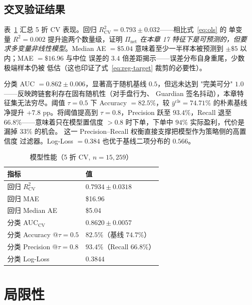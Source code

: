 \documentclass[sigconf,nonacm,10pt]{acmart}
\newcommand{\Pnet}{\Pi_{\text{net}}}
\begin{document}
\subsection{交叉验证结果}

表~\ref{tab:model} 汇总 5 折 CV 表现。回归
$R^2_{\text{CV}}=0.793\pm0.032$——相比式~\eqref{eq:ols} 的
单变量 $R^2=0.002$ 提升逾两个数量级，证明 \emph{$\Pnet$ 在本章
17 特征下是可预测的，但要求多变量非线性模型}。Median AE $=\$5.04$
意味着至少一半样本被预测到 $\pm\$5$ 以内；MAE $=\$16.96$ 与中位
误差的 $3.4$ 倍差距揭示——误差分布自身重尾，少数极端样本仍被
低估（这也印证了式~\eqref{eq:reg-target} 裁剪的必要性）。

分类 AUC $=0.862\pm0.006$，显著高于随机基线 $0.5$，但远未达到
"完美可分" $1.0$——反映跨链套利存在固有随机性（对手盘行为、
Guardian 签名抖动），本章特征集无法穷尽。阈值 $\tau=0.5$ 下
Accuracy $=82.5\%$，较 $\bar y^{\text{cls}}=74.71\%$ 的朴素基线
净提升 $+7.8$ pp。将阈值提高到 $\tau=0.8$，Precision 跃至
$93.4\%$，Recall 退至 $66.8\%$——意味着只在模型置信度 $>0.8$
时下单，下单中 $94\%$ 实际盈利，代价是漏掉 $33\%$ 的机会。
这一 Precision--Recall 权衡直接支撑把模型作为策略侧的高置信度
过滤器。Log-Loss $=0.384$ 也优于基线二项分布的 $0.566$。

\begin{table}[h]
  \centering
  \small
  \caption{模型性能（5 折 CV, $n=15{,}259$）}
  \label{tab:model}
  \begin{tabular}{ll}
    \toprule
    \textbf{指标}                    & \textbf{值} \\
    \midrule
    回归 $R^2_{\text{CV}}$          & $0.7934 \pm 0.0318$ \\
    回归 MAE                         & \$16.96 \\
    回归 Median AE                   & \$5.04 \\
    分类 AUC$_{\text{CV}}$          & $0.8620 \pm 0.0057$ \\
    分类 Accuracy @$\tau=0.5$       & $82.5\%$（基线 $74.7\%$）\\
    分类 Precision @$\tau=0.8$      & $93.4\%$（Recall $66.8\%$）\\
    分类 Log-Loss                   & $0.3844$ \\
    \bottomrule
  \end{tabular}
\end{table}

\section{局限性}
\label{sec:limitations}
\end{document}
